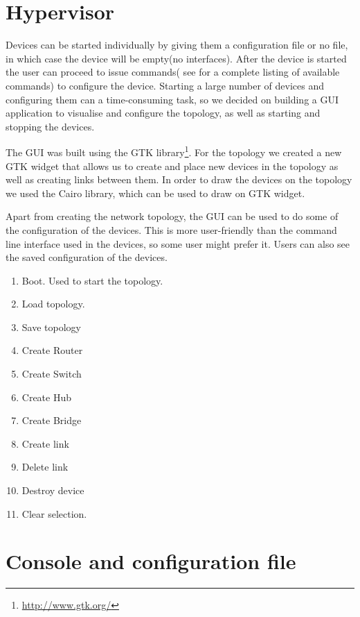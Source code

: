 \section{Hypervisor}
\label{sec:hypervisor2}

Devices can be started individually by giving them a configuration file or no file, in which case the device
will be empty(no interfaces). After the device is started the user can proceed to issue commands( see  
for a complete listing of available commands) to configure the device. Starting a large number of
devices and configuring them can a time-consuming task, so we decided on building a GUI application to visualise and configure
the topology, as well as starting and stopping the devices.


The GUI was built using the GTK library\footnote{\url{http://www.gtk.org/}}. For the topology we created a new GTK widget
that allows us to create and place new devices in the topology as well as creating links between them. In order to draw
the devices on the topology we used the Cairo library, which can be used to draw on GTK widget.

Apart from creating the network topology, the GUI can be used to do some of the configuration of the devices. This is 
more user-friendly than the command line interface used in the devices, so some user might prefer it. Users can also see
the saved configuration of the devices.

\begin{enumerate}
  \item Boot. Used to start the topology. 
  \item Load topology. 
  \item Save topology
  \item Create Router
  \item Create Switch
  \item Create Hub
  \item Create Bridge
  \item Create link
  \item Delete link
  \item Destroy device
  \item Clear selection. 
\end{enumerate}

\section{Console and configuration file}
\label{sec:dev-conf}

